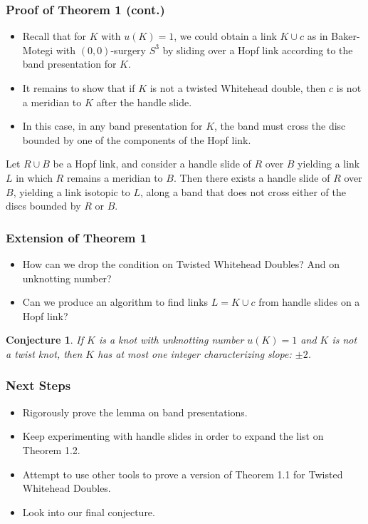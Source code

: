 \documentclass{beamer}
\newtheorem{conjecture}[theorem]{Conjecture}
\theoremstyle{ex}
\theoremstyle{rem}
\begin{document}
	\begin{frame}
		\frametitle{Proof of Theorem 1 (cont.)}
		\begin{itemize}
			\item Recall that  for $K$ with $u(K)=1$, we could obtain a link $K\cup c$ as in Baker-Motegi with $(0,0)$-surgery $S^3$ by sliding over a Hopf link according to the band presentation for $K$.
			
			\item It remains to show that if $K$ is not a twisted Whitehead double, then $c$ is not a meridian to $K$ after the handle slide.
			
			\item In this case, in any band presentation for $K$, the band must cross the disc bounded by one of the components of the Hopf link.
			
		\end{itemize}
	
		\begin{lemma}
			Let $R\cup B$ be a Hopf link, and consider a handle slide of $R$ over $B$ yielding a link $L$ in which $R$ remains a meridian to $B$. Then there exists a handle slide of $R$ over $B$, yielding a link isotopic to $L$, along a band that does not cross either of the discs bounded by $R$ or $B$.
		\end{lemma}
	\end{frame}

\begin{frame}
	\frametitle{Extension of Theorem 1}
	\begin{itemize}
		\item How can we drop the condition on Twisted Whitehead Doubles? And on unknotting number?
		\item Can we produce an algorithm to find links $L = K \cup c$ from handle slides on a Hopf link?
	\end{itemize}
	\begin{conjecture}
		If $K$ is a knot with unknotting number $u(K) = 1$ and $K$ is not a twist knot, then $K$ has at most \textit{one} integer characterizing slope: $\pm 2$.
	\end{conjecture}
\end{frame}

\begin{frame}
	\frametitle{Next Steps}
	\begin{itemize}
		\item Rigorously prove the lemma on band presentations.
		\item Keep experimenting with handle slides in order to expand the list on Theorem 1.2.
		\item Attempt to use other tools to prove a version of Theorem 1.1 for Twisted Whitehead Doubles.
		\item Look into our final conjecture.
	\end{itemize}
\end{frame}
\end{document}
